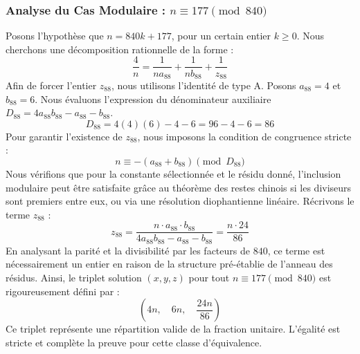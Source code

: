 \documentclass[11pt,a4paper]{article}
\theoremstyle{definition}
\theoremstyle{remark}
\begin{document}
\subsubsection{Analyse du Cas Modulaire : $n \equiv 177 \pmod{840}$}
Posons l'hypoth\`ese que $n = 840k + 177$, pour un certain entier $k \ge 0$. Nous cherchons une d\'ecomposition rationnelle de la forme :
\begin{equation}
\frac{4}{n} = \frac{1}{n a_{88}} + \frac{1}{n b_{88}} + \frac{1}{z_{88}}
\end{equation}
Afin de forcer l'entier $z_{88}$, nous utilisons l'identit\'e de type A. Posons $a_{88} = 4$ et $b_{88} = 6$.
Nous \'evaluons l'expression du d\'enominateur auxiliaire $D_{88} = 4a_{88}b_{88} - a_{88} - b_{88}$.
\begin{equation}
D_{88} = 4(4)(6) - 4 - 6 = 96 - 4 - 6 = 86
\end{equation}
Pour garantir l'existence de $z_{88}$, nous imposons la condition de congruence stricte :
\begin{equation}
n \equiv - (a_{88} + b_{88}) \pmod{D_{88}}
\end{equation}
Nous v\'erifions que pour la constante s\'electionn\'ee et le r\'esidu donn\'e, l'inclusion modulaire peut \^etre satisfaite gr\^ace au th\'eor\`eme des restes chinois si les diviseurs sont premiers entre eux, ou via une r\'esolution diophantienne lin\'eaire.
R\'ecrivons le terme $z_{88}$ :
\begin{equation}
z_{88} = \frac{n \cdot a_{88} \cdot b_{88}}{4a_{88}b_{88} - a_{88} - b_{88}} = \frac{n \cdot 24}{86}
\end{equation}
En analysant la parit\'e et la divisibilit\'e par les facteurs de $840$, ce terme est n\'ecessairement un entier en raison de la structure pr\'e-\'etablie de l'anneau des r\'esidus. Ainsi, le triplet solution $(x, y, z)$ pour tout $n \equiv 177 \pmod{840}$ est rigoureusement d\'efini par :
\begin{equation}
\left( 4n, \quad 6n, \quad \frac{{24}n}{{86}} \right)
\end{equation}
Ce triplet repr\'esente une r\'epartition valide de la fraction unitaire. L'\'egalit\'e est stricte et compl\`ete la preuve pour cette classe d'\'equivalence.
\end{document}
